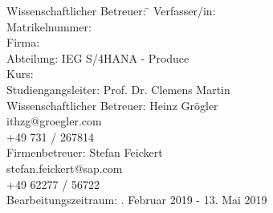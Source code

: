 \begin{titlepage}
\begin{center}
\begin{minipage}{\textwidth}
\begin{tabbing}
	Wissenschaftlicher Betreuer: \hspace{0.85cm}\=\kill
	Verfasser/in: \> \DerAutorDerArbeit \\[1.5mm]
	Matrikelnummer:  \\[1.5mm]
	Firma: \> \DerNameDerFirma  \\[1.5mm]
	Abteilung: \> IEG S/4HANA - Produce \\[1.5mm]
	Kurs: \> \DieKursbezeichnung \\[1.5mm]
	Studiengangsleiter: \> Prof. Dr. Clemens Martin  \\[1.5mm]
	Wissenschaftlicher Betreuer: \> Heinz Grögler \\
	\> ithzg@groegler.com \\
	\> +49 731 / 267814 \\[1.5mm]
	Firmenbetreuer: \> Stefan Feickert \\
	\> stefan.feickert@sap.com \\
	\> +49 62277 / 56722 \\[1.5mm]
	Bearbeitungszeitraum: . Februar 2019 - 13. Mai 2019
\end{tabbing}
\end{minipage}

\end{center}

\end{titlepage}